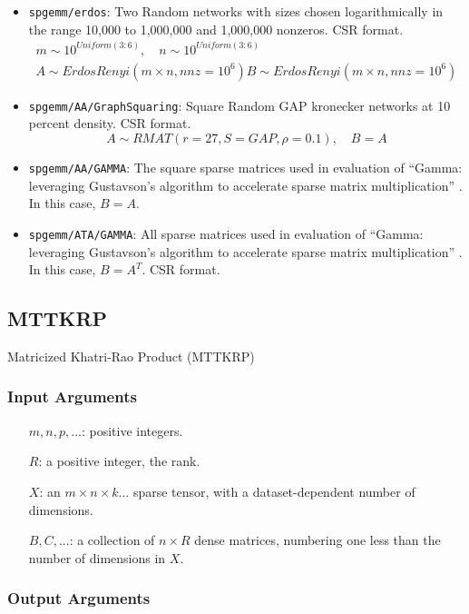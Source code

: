 \documentclass{article}
\begin{document}
\begin{itemize}
	\item \texttt{spgemm/erdos}: Two Random networks with sizes chosen logarithmically in the range 10,000 to 1,000,000 and 1,000,000 nonzeros. CSR format.
	\begin{multline*}
		m \sim 10^{Uniform(3:6)}, \quad n \sim 10^{Uniform(3:6)} \\
			A \sim ErdosRenyi\left(m\times n, nnz=10^6\right)
			B \sim ErdosRenyi\left(m\times n, nnz=10^6\right)
	\end{multline*}
	\item \texttt{spgemm/AA/GraphSquaring}: Square Random GAP kronecker networks at 10 percent density. CSR format.
	\[
		A \sim RMAT\left(r=27, S = GAP, \rho = 0.1\right), \quad B = A
	\]
	\item \texttt{spgemm/AA/GAMMA}: The square sparse matrices used in evaluation of
	``Gamma: leveraging Gustavson’s algorithm to accelerate sparse matrix multiplication'' \cite{zhang_gamma_2021}. In this case, $B = A$. 
	\item \texttt{spgemm/ATA/GAMMA}: All sparse matrices used in evaluation of
	``Gamma: leveraging Gustavson’s algorithm to accelerate sparse matrix multiplication'' \cite{zhang_gamma_2021}. In this case, $B = A^T$. CSR format.
\end{itemize}

\subsection{MTTKRP}
Matricized Khatri-Rao Product (MTTKRP)
\subsubsection{Input Arguments}

\begin{itemize}
	\item[$m, n, p, ...$:] positive integers.
	\item[$R$:] a positive integer, the rank.
	\item[$X$:] an $m \times n \times k ...$ sparse tensor, with a dataset-dependent number of dimensions.
	\item[$B, C, ...$:] a collection of $n \times R$ dense matrices, numbering one less than the number of dimensions in $X$.
\end{itemize}

\subsubsection{Output Arguments}
\end{document}
